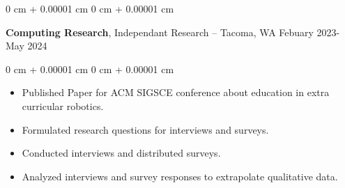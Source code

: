 \documentclass[10pt, letterpaper]{article}
\newenvironment{highlights}{
    \begin{itemize}[
        topsep=0.10 cm,
        parsep=0.10 cm,
        partopsep=0pt,
        itemsep=0pt,
        leftmargin=0 cm + 10pt
    ]
}{
    \end{itemize}
} %
\newenvironment{onecolentry}{
    \begin{adjustwidth}{
        0 cm + 0.00001 cm
    }{
        0 cm + 0.00001 cm
    }
}{
    \end{adjustwidth}
} %
\newenvironment{twocolentry}[2][]{
    \onecolentry
    \def\secondColumn{#2}
    \setcolumnwidth{\fill, 4.5 cm}
    \begin{paracol}{2}
}{
    \switchcolumn \raggedleft \secondColumn
    \end{paracol}
    \endonecolentry
} %
\begin{document}
        \vspace{0.2 cm}

        \begin{twocolentry}{
            Febuary 2023- May 2024
        }
            \textbf{Computing Research}, Independant Research -- Tacoma, WA\end{twocolentry}

        \vspace{0.20 cm}
        \begin{onecolentry}
            \begin{highlights}
              \item Published Paper for ACM SIGSCE conference about education in extra curricular robotics.
              \item Formulated research questions for interviews and surveys.
              \item Conducted interviews and distributed surveys.
              \item Analyzed interviews and survey responses to extrapolate qualitative data.
            \end{highlights}
        \end{onecolentry}
        \vspace{0.2 cm}
\end{document}
